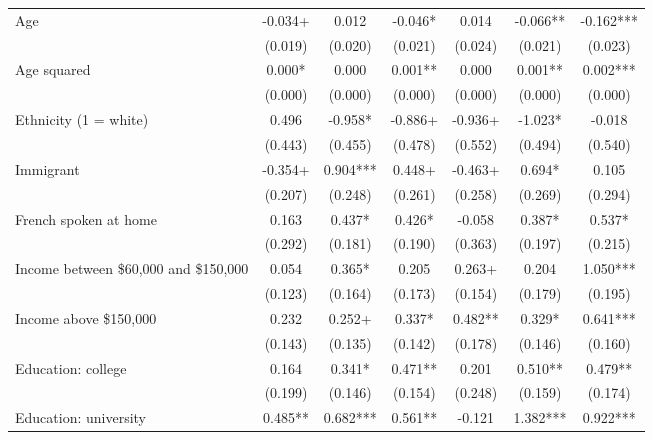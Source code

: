 \documentclass[
  letterpaper,
  DIV=11,
  numbers=noendperiod]{scrreprt}
\begin{document}
\begin{table}
\begin{tabular}[t]{lcccccc}
\hspace{1em}Age & -0.034+ & 0.012 & -0.046* & 0.014 & -0.066** & -0.162***\\
\hspace{1em} & (0.019) & (0.020) & (0.021) & (0.024) & (0.021) & (0.023)\\
\hspace{1em}Age squared & 0.000* & 0.000 & 0.001** & 0.000 & 0.001** & 0.002***\\
\hspace{1em} & (0.000) & (0.000) & (0.000) & (0.000) & (0.000) & (0.000)\\
\hspace{1em}Ethnicity (1 = white) & 0.496 & -0.958* & -0.886+ & -0.936+ & -1.023* & -0.018\\
\hspace{1em} & (0.443) & (0.455) & (0.478) & (0.552) & (0.494) & (0.540)\\
\hspace{1em}Immigrant & -0.354+ & 0.904*** & 0.448+ & -0.463+ & 0.694* & 0.105\\
\hspace{1em} & (0.207) & (0.248) & (0.261) & (0.258) & (0.269) & (0.294)\\
\hspace{1em}French spoken at home & 0.163 & 0.437* & 0.426* & -0.058 & 0.387* & 0.537*\\
\hspace{1em} & (0.292) & (0.181) & (0.190) & (0.363) & (0.197) & (0.215)\\
\hspace{1em}Income between \$60,000 and \$150,000 & 0.054 & 0.365* & 0.205 & 0.263+ & 0.204 & 1.050***\\
\hspace{1em} & (0.123) & (0.164) & (0.173) & (0.154) & (0.179) & (0.195)\\
\hspace{1em}Income above \$150,000 & 0.232 & 0.252+ & 0.337* & 0.482** & 0.329* & 0.641***\\
\hspace{1em} & (0.143) & (0.135) & (0.142) & (0.178) & (0.146) & (0.160)\\
\hspace{1em}Education: college & 0.164 & 0.341* & 0.471** & 0.201 & 0.510** & 0.479**\\
\hspace{1em} & (0.199) & (0.146) & (0.154) & (0.248) & (0.159) & (0.174)\\
\hspace{1em}Education: university & 0.485** & 0.682*** & 0.561** & -0.121 & 1.382*** & 0.922***\\

\end{tabular}
\end{table}
\end{document}
